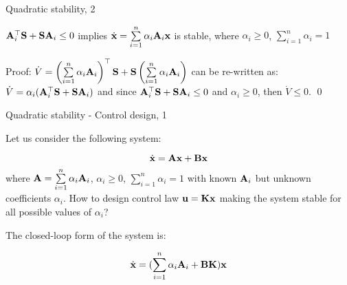 \documentclass{beamer}
\begin{document}
\begin{frame}{Quadratic stability, 2}
	\begin{flushleft}
		
		\begin{theorem}
			$\mathbf{A}_i^\top \mathbf{S} + \mathbf{S} \mathbf{A}_i \leq 0$ implies $\dot{\mathbf{x}} = \sum\limits_{i=1}^{n} \alpha_i \mathbf{A}_i \mathbf{x}$ is stable, where $\alpha_i \geq 0$, $\sum\limits_{i=1}^{n} \alpha_i = 1$
		\end{theorem}
		
		\bigskip
		
		Proof: $\dot V = \left(\sum\limits_{i=1}^{n} \alpha_i \mathbf{A}_i \right)^\top \mathbf{S} + \mathbf{S} 
		\left( \sum\limits_{i=1}^{n} \alpha_i \mathbf{A}_i \right)$ can be re-written as: 
		$\dot V = \alpha_i (\mathbf{A}_i^\top \mathbf{S} + \mathbf{S} \mathbf{A}_i)$ and since $\mathbf{A}_i^\top \mathbf{S} + \mathbf{S} \mathbf{A}_i \leq 0$ and $\alpha_i \geq 0$, then $\dot V \leq 0$. \qed
		
	\end{flushleft}
\end{frame}




\begin{frame}{Quadratic stability - Control design, 1}
	\begin{flushleft}
		
		Let us consider the following system:
		
		\begin{equation}
			\dot{\mathbf{x}} = \mathbf{A}\mathbf{x} + \mathbf{B}\mathbf{x}
		\end{equation}
		where $\mathbf{A} = \sum\limits_{i=1}^{n} \alpha_i \mathbf{A}_i$, $\alpha_i \geq 0$, $\sum\limits_{i=1}^{n} \alpha_i = 1$ with known $\mathbf{A}_i$ but unknown coefficients $\alpha_i$. How to design control law $\mathbf{u} = \mathbf{K}\mathbf{x}$ making the system stable for all possible values of $\alpha_i$? 
		
		\bigskip
		
		The closed-loop form of the system is:
		
		\begin{equation}
			\dot{\mathbf{x}} = (\sum\limits_{i=1}^{n} \alpha_i \mathbf{A}_i + \mathbf{B}\mathbf{K})\mathbf{x}
		\end{equation}
		
		
	\end{flushleft}
\end{frame}
\end{document}
